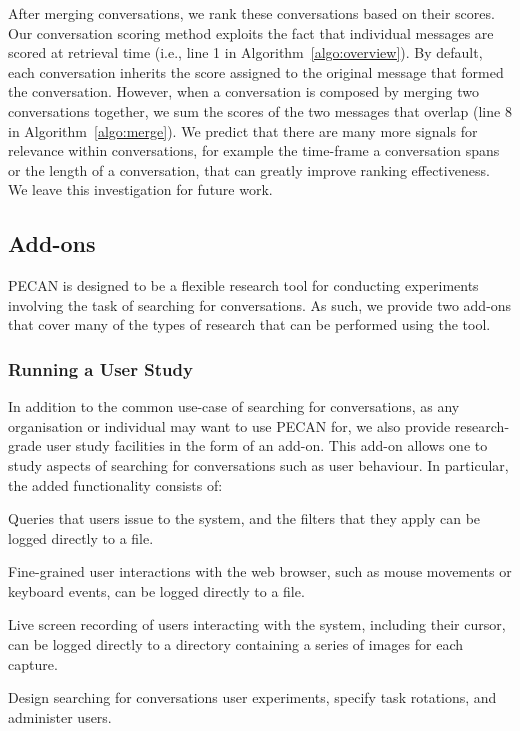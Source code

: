 After merging conversations, we rank these conversations based on their scores. Our conversation scoring method exploits the fact that individual messages are scored at retrieval time (i.e., line 1 in Algorithm~\ref{algo:overview}). By default, each conversation inherits the score assigned to the original message that formed the conversation. However, when a conversation is composed by merging two conversations together, we sum the scores of the two messages that overlap (line 8 in Algorithm~\ref{algo:merge}). We predict that there are many more signals for relevance within conversations, for example the time-frame a conversation spans or the length of a conversation, that can greatly improve ranking effectiveness. We leave this investigation for future work.

\vspace{-8pt}
\subsection{Add-ons}

PECAN is designed to be a flexible research tool for conducting experiments involving the task of searching for conversations. As such, we provide two add-ons that cover many of the types of research that can be performed using the tool.

\vspace{-4pt}
\subsubsection{Running a User Study}

In addition to the common use-case of searching for conversations, as any organisation or individual may want to use PECAN for, we also provide research-grade user study facilities in the form of an add-on. This add-on allows one to study aspects of searching for conversations such as user behaviour. In particular, the added functionality consists of:
\vspace{-2pt}
\begin{description}[noitemsep, leftmargin=8pt]
\item[Query Logging.] Queries that users issue to the system, and the filters that they apply can be logged directly to a file. 
\item[Interaction Logging.] Fine-grained user interactions with the web browser, such as mouse movements or keyboard events, can be logged directly to a file.
\item[Screen Recording.] Live screen recording of users interacting with the system, including their cursor, can be logged directly to a directory containing a series of images for each capture.
\item[Administration.] Design searching for conversations user experiments, specify task rotations, and administer users.
\end{description}

